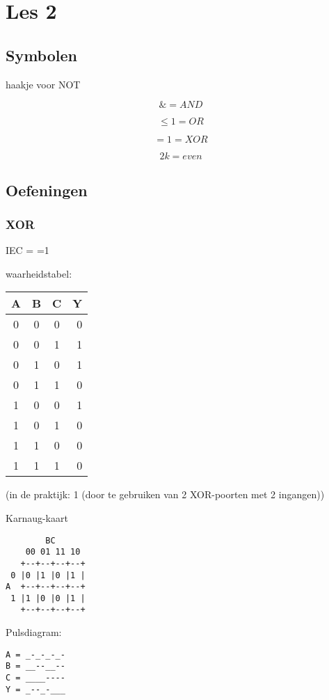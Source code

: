 \documentclass[11pt, a4paper]{article}
\begin{document}
\newpage

\section{Les 2}

\subsection{Symbolen}

haakje voor NOT

$$\& = AND$$

$$\le1 = OR$$

$$=1 = XOR$$

$$2k = even$$

\subsection{Oefeningen}

\subsubsection{XOR}

IEC = =1

waarheidstabel:

\begin{tabular}{c c c || r}
A & B & C & Y \\
\hline
0 & 0 & 0 & 0 \\
0 & 0 & 1 & 1 \\
0 & 1 & 0 & 1 \\
0 & 1 & 1 & 0 \\
1 & 0 & 0 & 1 \\
1 & 0 & 1 & 0 \\
1 & 1 & 0 & 0 \\
1 & 1 & 1 & 0 \\
\end{tabular}

(in de praktijk: 1 (door te gebruiken van 2 XOR-poorten met 2 ingangen))

Karnaug-kaart

\begin{verbatim}
        BC
    00 01 11 10
   +--+--+--+--+
 0 |0 |1 |0 |1 |
A  +--+--+--+--+
 1 |1 |0 |0 |1 |
   +--+--+--+--+
\end{verbatim}

Pulsdiagram:

\begin{verbatim}
A = _-_-_-_-
B = __--__--
C = ____----
Y = _--_-___
\end{verbatim}
\end{document}
